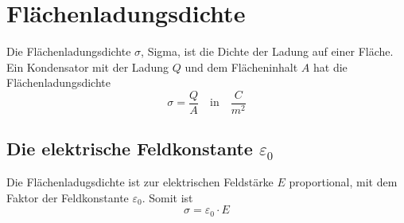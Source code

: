 \documentclass{article}
\begin{document}
 
 
\section{Flächenladungsdichte} 
Die Flächenladungsdichte $\sigma$, Sigma, ist die Dichte der Ladung auf einer Fläche. Ein Kondensator mit der Ladung $Q$ und dem Flächeninhalt $A$ hat die Flächenladungsdichte
\[
 \sigma = \frac{Q}{A}  
 \quad \text{in} \quad
 \frac{C}{m^2} 
\]
 
\subsection{Die elektrische Feldkonstante $\varepsilon_0$} 
Die Flächenladugsdichte ist zur elektrischen Feldstärke $E$ proportional, mit dem Faktor der Feldkonstante $\varepsilon_0$. Somit ist
\[
 \sigma = \varepsilon_0 \cdot E 
\]
 
\end{document}

